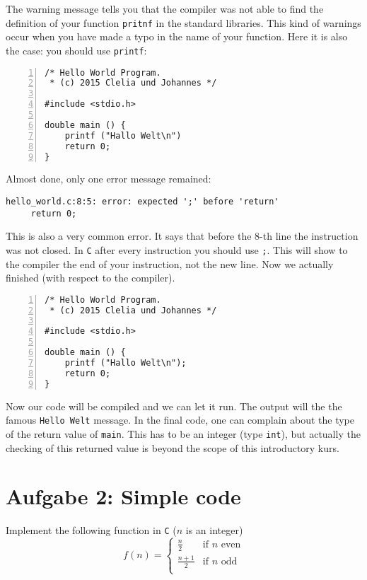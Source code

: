 \documentclass{article}[12pt]
\newenvironment{codelisting}{\fontfamily{pcr}\selectfont%
\lstset{commentstyle=\textit}\lstset{language=c}}{\fontfamily{ptm}\selectfont}
\begin{document}
The warning message tells you that the compiler was not able to find the definition of your function \texttt{pritnf}
in the standard libraries. This kind of warnings occur when you have made a typo in the name of your function. Here
it is also the case: you should use \texttt{printf}:
\begin{codelisting}
\begin{lstlisting}[numbers=left,numberstyle=\tiny,frame=tlrb,showstringspaces=false]
/* Hello World Program.
 * (c) 2015 Clelia und Johannes */

#include <stdio.h>

double main () {
    printf ("Hallo Welt\n")
    return 0;
}
\end{lstlisting}
\end{codelisting} 
Almost done, only one error message remained:
\begin{lstlisting}
hello_world.c:8:5: error: expected ';' before 'return'
     return 0;
\end{lstlisting}
This is also a very common error. It says that before the 8-th line the instruction was not closed. In \texttt{C}
after every instruction you should use \texttt{;}. This will show to the compiler the end of your instruction, not the
new line. Now we actually finished (with respect to the compiler).
\begin{codelisting}
\begin{lstlisting}[numbers=left,numberstyle=\tiny,frame=tlrb,showstringspaces=false]
/* Hello World Program.
 * (c) 2015 Clelia und Johannes */

#include <stdio.h>

double main () {
    printf ("Hallo Welt\n");
    return 0;
}
\end{lstlisting}
\end{codelisting}
Now our code will be compiled and we can let it run. The output will the the famous \texttt{Hello Welt} message.
In the final code, one can complain about the type of the return value of \texttt{main}. This has to be
an integer (type \texttt{int}), but actually the checking of this returned value is beyond the scope of
this introductory kurs.
\section{Aufgabe 2: Simple code}
Implement the following function in \texttt{C} ($n$ is an integer)
\[
	f(n) = \left\{ \begin{array}{ll}
	\frac{n}{2} & \text{if } n \text{ even} \\
	\frac{n+1}{2} & \text{if } n \text{ odd} \\
	\end{array}
	\right.
\]
\end{document}
